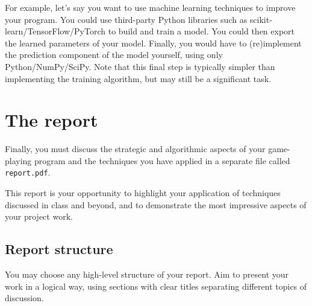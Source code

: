 \documentclass[]{article}
\begin{document}
For example, let's say you want to use machine learning techniques to
improve your program.
%
You could use third-party Python libraries
such as scikit-learn/TensorFlow/PyTorch
to build and train a model.
%
You could then export the learned parameters of your model.
%
Finally, you would have to (re)implement the prediction component of the model
yourself, using only Python/NumPy/SciPy.
%
Note that this final step is typically simpler than implementing the
training algorithm, but may still be a significant task.



\section{The report}
\label{sec:report}

Finally, you must discuss the strategic and algorithmic aspects of your
game-playing program and the techniques you have applied in a separate
file called \texttt{report.pdf}.

This report is your opportunity to highlight your application of
techniques discussed in class and beyond, and to demonstrate the most
impressive aspects of your project work.

\subsection{Report structure}

You may choose any high-level structure of your report.
%
Aim to present your work in a logical way, using sections with clear
titles separating different topics of discussion.
\end{document}
